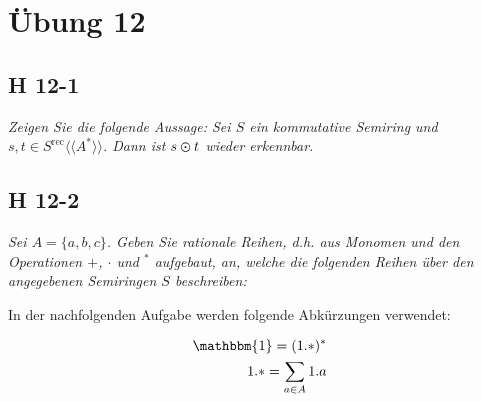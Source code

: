 \documentclass{scrartcl}
\begin{document}
\section{Übung 12}

\subsection{H 12-1}

\textsl{Zeigen Sie die folgende Aussage: Sei $S$ ein kommutative Semiring und $s, t \in S^{\text{rec}}\langle\langle A^* \rangle\rangle$. Dann ist $s \varodot t$ wieder erkennbar.}

\subsection{H 12-2}

\textsl{Sei $A = \{a, b, c\}$. Geben Sie rationale Reihen, d.h. aus Monomen und den Operationen $+$, $\cdot$ und ${}^*$ aufgebaut, an, welche die folgenden Reihen über den angegebenen Semiringen $S$ beschreiben:}

In der nachfolgenden Aufgabe werden folgende Abkürzungen verwendet:

\begin{align*}
  \mathbbm{1} = (1.*)^*\\
  1.* = \sum\limits_{a \in A} 1.a\\
\end{align*}
\end{document}
